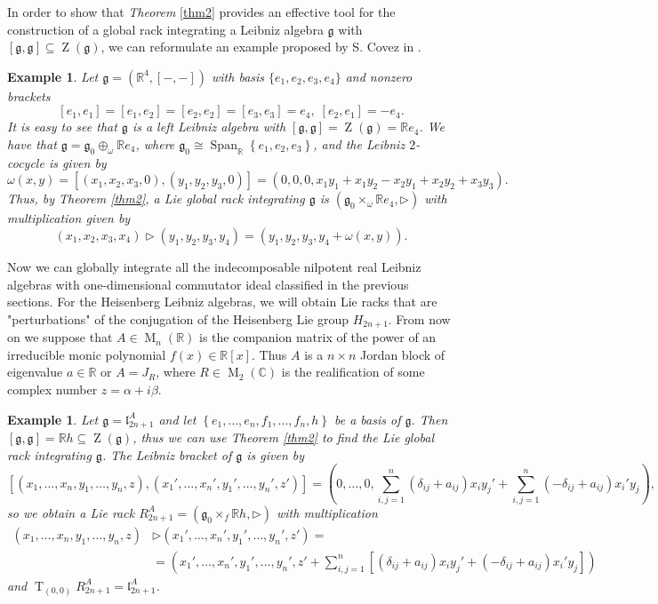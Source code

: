 \documentclass[english,4paper,10pt]{article}
\newcommand{\R}{\mathbb{R}}
\newcommand{\mg}{\mathfrak{g}}
\newtheorem{ex}[thm]{Example}
\begin{document}
In order to show that \textit{Theorem} \ref{thm2} provides an effective tool for the construction of a global rack integrating a Leibniz algebra $\mg$ with $[\mg,\mg] \subseteq \operatorname{Z}(\mg)$, we can reformulate an example proposed by S. Covez in \cite{covez2013local}.

\begin{ex}
	Let $\mg=(\mathbb{R}^4,[-,-])$ with basis $\lbrace e_1,e_2,e_3,e_4\rbrace$ and nonzero brackets
	$$
	[e_1,e_1]=[e_1,e_2]=[e_2,e_2]=[e_3,e_3]=e_4, \; [e_2,e_1]=-e_4.
	$$
	It is easy to see that $\mg$ is a left Leibniz algebra with $[\mg,\mg]=\operatorname{Z}(\mg)=\mathbb{R}e_4$. We have that $\mg=\mg_0\oplus_\omega \R e_4$, where $\mg_0\cong \operatorname{Span}_\R\left\{e_1,e_2,e_3\right\}$, and the Leibniz $2$-cocycle is given by
	$$
	\omega(x,y)=\left[(x_1,x_2,x_3,0),(y_1,y_2,y_3,0)\right]=(0,0,0,x_1y_1+x_1y_2-x_2y_1+x_2y_2+x_3y_3).
	$$
	Thus, by \textit{Theorem} \ref{thm2}, a Lie global rack integrating $\mg$ is $\left(\mg_0\times_\omega \R e_4,\rhd\right)$ with multiplication given by
	$$
	(x_1,x_2,x_3,x_4)\rhd(y_1,y_2,y_3,y_4)=(y_1,y_2,y_3,y_4+\omega(x,y)).
	$$
\end{ex}

Now we can globally integrate all the indecomposable nilpotent real Leibniz algebras with one-dimensional commutator ideal classified in the previous sections. For the Heisenberg Leibniz algebras, we will obtain Lie racks that are "perturbations" of the conjugation of the Heisenberg Lie group $H_{2n+1}$. From now on we suppose that $A \in \operatorname{M}_n(\mathbb{R})$ is the companion matrix of the power of an irreducible monic polynomial $f(x) \in \mathbb{R}[x]$. Thus $A$ is a $n \times n$ Jordan block of eigenvalue $a \in \mathbb{R}$ or $A=J_R$, where $R \in \operatorname{M}_2(\mathbb{C})$ is the realification of some complex number $z=\alpha + i \beta$.

\begin{ex}
Let $\mg=\mathfrak{l}_{2n+1}^A$ and let $\left\{e_1,\ldots,e_n,f_1,\ldots,f_n,h\right\}$ be a basis of $\mg$. Then $\left[\mg,\mg\right]=\mathbb{R}h\subseteq \operatorname{Z}(\mg)$, thus we can use \textit{Theorem} \ref{thm2} to find the Lie global rack integrating $\mg$. The Leibniz bracket of $\mg$ is given by
$$
\left[(x_1,\ldots,x_n, y_1,\ldots, y_n, z),(x_1',\ldots,x_n', y_1',\ldots, y_n', z')\right]=\left(0,\ldots,0,\sum_{i,j=1}^{n}\left(\delta_{ij}+a_{ij}\right)x_iy_j'+\sum_{i,j=1}^{n}\left(-\delta_{ij}+a_{ij}\right)x_i'y_j\right),
$$ 
so we obtain a Lie rack $R_{2n+1}^{A}=(\mg_0\times_f \mathbb{R}h,\rhd)$ with multiplication 
\begin{align*}
	(x_1,\ldots,x_n,y_1,\ldots,y_n,z)&\rhd (x_1',\ldots,x_n',y_1',\ldots,y_n',z')=\\ &=\left(x_1',\ldots,x_n',y_1',\ldots,y_n',z'+\sum_{i,j=1}^{n}\left[\left(\delta_{ij}+a_{ij}\right)x_iy_j'+\left(-\delta_{ij}+a_{ij}\right)x_i'y_j\right]\right)
\end{align*}
and $\operatorname{T}_{(0,0)}R_{2n+1}^{A}=\mathfrak{l}_{2n+1}^A$.
\end{ex}
\end{document}
